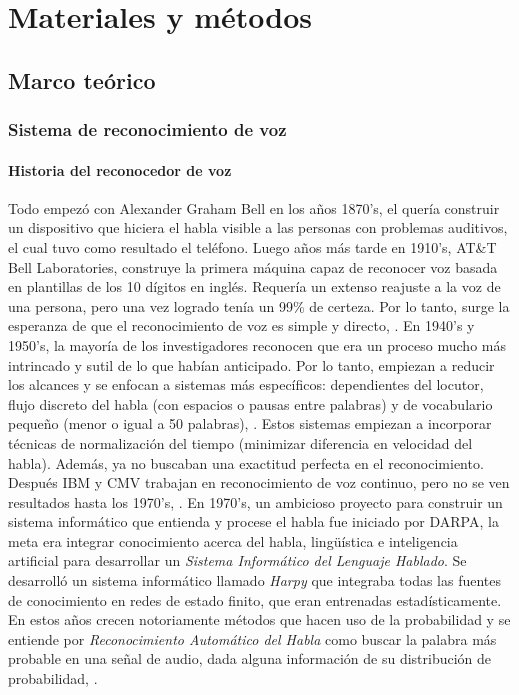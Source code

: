 \chapter{Materiales y métodos}
\section{Marco teórico}
\subsection{Sistema de reconocimiento de voz}

\subsubsection{Historia del reconocedor de voz}
Todo empezó con Alexander Graham Bell en los años 1870’s, el quería construir un dispositivo que hiciera el habla visible a las personas con problemas auditivos, el cual tuvo como resultado el teléfono. Luego años más tarde en 1910’s, AT\&T Bell Laboratories, construye la primera máquina capaz de reconocer voz basada en plantillas de los 10 dígitos en inglés. Requería un extenso reajuste a la voz de una persona, pero una vez logrado tenía un 99\% de certeza. Por lo tanto, surge la esperanza de que el reconocimiento de voz es simple y directo, \citep{eyra}.
\vskip 0.5cm
En 1940’s y 1950’s, la mayoría de los investigadores reconocen que era un proceso mucho más intrincado y sutil de lo que habían anticipado. Por lo tanto, empiezan a reducir los alcances y se enfocan a sistemas más específicos: dependientes del locutor, flujo discreto del habla (con espacios o pausas entre palabras) y de vocabulario pequeño (menor o igual a 50 palabras), \citep{eyra}.
\vskip 0.5cm
Estos sistemas empiezan a incorporar técnicas de normalización del tiempo (minimizar diferencia en velocidad del habla). Además, ya no buscaban una exactitud perfecta en el reconocimiento. Después IBM y CMV trabajan en reconocimiento de voz continuo, pero no se ven resultados hasta los 1970’s, \citep{eyra}.
\vskip 0.5cm
En 1970’s, un ambicioso proyecto para construir un sistema informático que entienda y procese el habla fue iniciado por DARPA, la meta era integrar conocimiento acerca del habla, lingüística e inteligencia artificial para desarrollar un \textit{Sistema Informático del Lenguaje Hablado}. Se desarrolló un sistema informático llamado \textit{Harpy} que integraba todas las fuentes de conocimiento en redes de estado finito, que eran entrenadas estadísticamente. En estos años crecen notoriamente métodos que hacen uso de la probabilidad y se entiende por \textit{Reconocimiento Automático del Habla} como buscar la palabra más probable en una señal de audio, dada alguna información de su distribución de probabilidad, \citep{orlando}.
